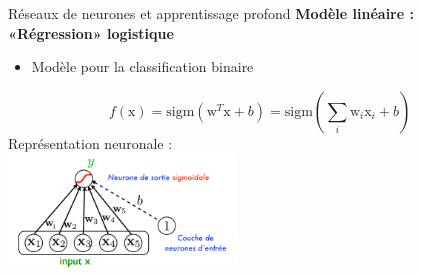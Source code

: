 \documentclass[french]{beamer}
\begin{document}
\begin{frame}{Réseaux de neurones et apprentissage profond}
\textbf{Modèle linéaire : «Régression» logistique}
\vspace{0.5cm}
\begin{itemize}
	\item Modèle pour la classification binaire
\end{itemize}
$$ f(\mathrm{x}) = \mathrm{sigm}\left( \mathrm{w}^T\mathrm{x} + b \right) = \mathrm{sigm}\left( \sum_i \mathrm{w}_i \mathrm{x}_i + b \right) $$
Représentation neuronale :\\
\centering
\includegraphics[height=3cm]{figures/logistic_regression}
\end{frame}
\end{document}

